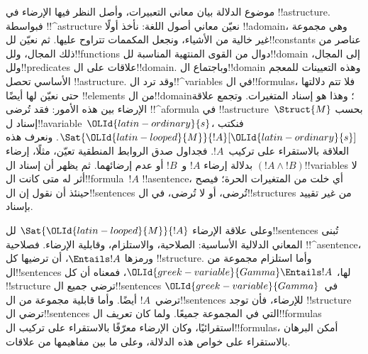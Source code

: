 \documentclass[../../../include/open-logic-section]{subfiles}
\begin{document}


موضوع الدلالة بيان معاني التعبيرات، وأصل النظر فيها الإرضاء في
!!a{structure}. فبواسطة !!^a{structure} نعيّن معاني أصول اللغة:
نأخذ أولًا !!a{domain}، وهي مجموعة غير خالية من الأشياء، ونجعل
المكممات تتراوح عليها. ثم نعيّن لل!!{constant}s عناصر من ذلك
المجال، ولل!!{function}s دوال من القوى المنتهية المناسبة
لل!!{domain} إلى المجال، ولل!!{predicate}s علاقات على
ال!!{domain}. وباجتماع ال!!{domain} وهذه التعيينات للمعجم الأساسي
تحصل !!a{structure}. وقد ترد ال!!^{variable}s في ال!!{formula}s،
فلا تتم دلالتها حتى نعيّن لها أيضًا !!{element}s من
ال!!{domain}؛ وهذا هو إسناد المتغيرات. وتجمع علاقة الإرضاء بين
هذه الأمور: فقد تُرضى !!^a{formula} في
!!a{structure}~$\Struct{M}$ بحسب إسناد ل!!a{variable}~${\OLId{latin-ordinary}{s}}$،
فنكتب $\Sat{{\OLId{latin-looped}{M}}}{!A}[{\OLId{latin-ordinary}{s}}]$. ونعرف هذه العلاقة بالاستقراء على تركيب~$!A$.
فجداول صدق الروابط المنطقية تعيّن، مثلًا، إرضاء $(!A \land !B)$
بدلالة إرضاء $!A$ و~$!B$ أو عدم إرضائهما. ثم يظهر أن إسناد
ال!!{variable}s لا أثر له متى كانت ال!!{formula}~$!A$ !!a{sentence}،
أي خلت من المتغيرات الحرة؛ فيصح حينئذ أن نقول إن
ال!!{sentence}s تُرضى، أو لا تُرضى، في ال!!{structure}s من غير
تقييد بإسناد.

وعلى علاقة الإرضاء $\Sat{{\OLId{latin-looped}{M}}}{!A}$ لل!!{sentence}s تُبنى المعاني
الدلالية الأساسية: الصلاحية، والاستلزام، وقابلية الإرضاء.
فصلاحية !!^a{sentence}، ورمزها $\Entails !A$، أن ترضيها كل
!!{structure}. وأما استلزام مجموعة من ال!!{sentence}s لها،
${\OLId{greek-variable}{Gamma}} \Entails !A$، فمعناه أن كل !!{structure} ترضي جميع
ال!!{sentence}s في~${\OLId{greek-variable}{Gamma}}$ ترضي~$!A$ أيضًا. وأما قابلية مجموعة من
ال!!{sentence}s للإرضاء، فأن توجد !!{structure} ترضي
ال!!{sentence}s التي في المجموعة جميعًا. ولما كان تعريف
ال!!{formula}s استقرائيًا، وكان الإرضاء معرّفًا بالاستقراء على
تركيب ال!!{formula}s، أمكن البرهان بالاستقراء على خواص هذه الدلالة،
وعلى ما بين مفاهيمها من علاقات.
\end{document}
